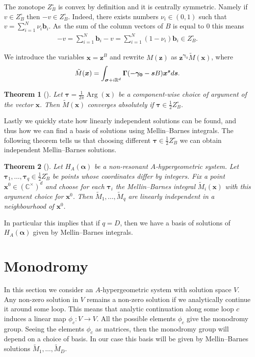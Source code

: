 \documentclass[11pt]{article}
\numberwithin{equation}{section}
\DeclareMathOperator*{\Arg}{Arg}
\numberwithin{equation}{section}
\newtheorem{Theorem}{Theorem}[section]
\begin{document}
\begin{Remark}
\label{rem-zonotope-sym}
The zonotope $Z_B^{\circ}$ is convex by definition and it is centrally symmetric. Namely if $v \in Z_B^{\circ}$ then $-v \in Z_B^{\circ}$. Indeed, there exists numbers $\nu_i \in (0,1)$ such that $v = \sum_{i=1}^N \nu_i\bm{b}_i$. As~the sum of the column vectors of $B$ is equal to $0$ this means \begin{gather*}
-v = \sum_{i=1}^{N} \bm{b}_i - v = \sum_{i=1}^N (1 - \nu_i)\bm{b}_i \in Z_B^{\circ}.
\end{gather*}
\end{Remark}
We introduce the variables $\bm{x}=\bm{z}^B$ and rewrite $M(\bm{z})$ as
$\bm{z}^{\bm\gamma_0}\tilde{M}(\bm{x})$, where
\begin{gather*}
\tilde{M}(\bm{x})=\int_{\bm{\sigma} + i\mathbb{R}^d} \bm{\Gamma}(-\bm{\gamma_0}-\bm{s}B)
\bm{x}^{\bm{s}} {\rm d} \bm{s}.
\end{gather*}
\begin{Theorem}[{\cite[Corollary 4.2]{Beu13}}] %
Let $\bm{\tau} = \frac{1}{2\pi}\Arg(\bm{x})$ be a component-wise choice of argument of the vector $\bm{x}$. Then $\tilde{M}(\bm{x})$ converges absolutely if
$\bm{\tau} \in \frac{1}{2}Z_B^{\circ}$.
\end{Theorem}

Lastly we quickly state how linearly independent solutions can be found, and thus how we can find a basis of solutions using Mellin--Barnes integrals. The following theorem tells us that choosing different $\bm\tau\in\frac12 Z_B^\circ$ we can obtain independent Mellin--Barnes solutions.

\begin{Theorem}[{\cite[Proposition 4.6]{Beu13}}] %
Let $H_A(\bm{\alpha})$ be a non-resonant $A$-hypergeometric system. Let
$\bm{\tau}_1,\dots,\bm{\tau}_q \in \frac{1}{2}Z_B^{\circ}$ be points whose coordinates
differ by integers. Fix a point $\bm{x}^0\in(\mathbb{C}^\times)^d$
and choose for each $\bm\tau_i$ the
Mellin--Barnes integral $\tilde{M}_i(\bm{x})$ with this argument choice for $\bm{x}^0$.
Then $\tilde{M}_1,\dots,\tilde{M}_q$ are linearly independent in a neighbourhood of $\bm{x}^0$.
\end{Theorem}
In particular this implies that if $q=D$, then we have a basis of solutions of
$H_A(\bm\alpha)$ given by Mellin--Barnes integrals.

\section{Monodromy}
\label{chap-mon}
In this section we consider an $A$-hypergeometric system with solution space $V$. Any non-zero solution in $V$ remains a non-zero solution if we analytically continue it around some loop.
This means that analytic continuation along some loop $c$ induces a linear map
$\phi_{c}\colon V \rightarrow V$.
All the possible elements $\phi_{c}$ give the monodromy group.
Seeing the elements $\phi_{c}$ as matrices, then the monodromy group will depend on a choice of basis. In our case this basis will be given by Mellin--Barnes solutions $\tilde{M}_1,\dots,\tilde{M}_D$.
\end{document}
